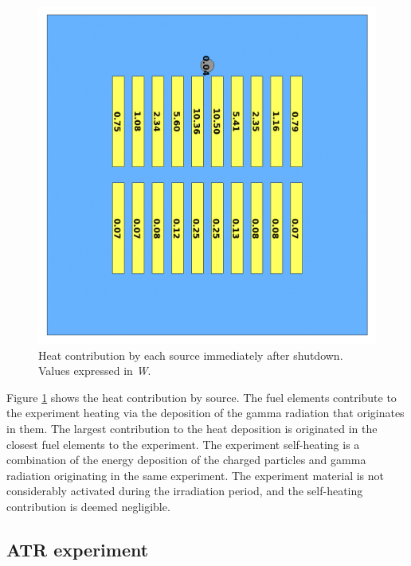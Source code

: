 \begin{figure}[htbp!] %
    \centering
    \includegraphics[width=0.70\linewidth]{figures/reference-contribs}
    \hfill
    \caption{Heat contribution by each source immediately after shutdown. Values expressed in \textit{W}.}
    \label{fig:demo-contrib}
\end{figure}

Figure \ref{fig:demo-contrib} shows the heat contribution by source.
The fuel elements contribute to the experiment heating via the deposition of the gamma radiation that originates in them.
The largest contribution to the heat deposition is originated in the closest fuel elements to the experiment.
The experiment self-heating is a combination of the energy deposition of the charged particles and gamma radiation originating in the same experiment.
The experiment material is not considerably activated during the irradiation period, and the self-heating contribution is deemed negligible.


\subsection{ATR experiment}
\label{sec:atrexp}



